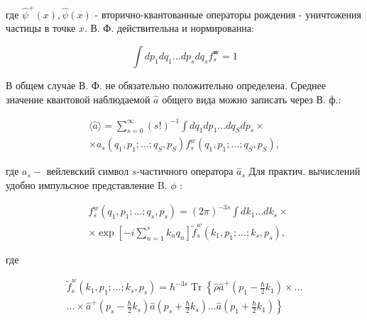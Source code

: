 \documentclass[10pt]{article}
\begin{document}
где $\hat{\psi}^{+}(x), \hat{\psi}(x)$ - вторично-квантованные операторы рождения - уничтожения частицы в точке $x$. В. Ф. действительна и нормированна:



\[

\int d p_{1} d q_{1} \ldots d p_{s} d q_{s} f_{s}^{\boldsymbol{w}}=1

\]



В общем случае В. Ф. не обязательно положительно определена. Среднее значение квантовой наблюдаемой $\hat{a}$ общего вида можно записать через В. ф.:



\[

\begin{gathered}

\langle\hat{a}\rangle=\sum_{s=0}^{\infty}(s !)^{-1} \int d q_{1} d p_{1} \ldots d q_{S} d p_{s} \times \\

\times a_{s}\left(q_{1}, p_{1} ; \ldots ; q_{S}, p_{S}\right) f_{s}^{w}\left(q_{1}, p_{1} ; \ldots ; q_{S}, p_{S}\right),

\end{gathered}

\]



где $a_{s}-$ вейлевский символ $s$-частичного оператора $\hat{a}_{s}$ Для практич. вычислений удобно импульсное представление B. $\phi$ :



\[

\begin{aligned}

& f_{s}^{w}\left(q_{1}, p_{1} ; \ldots ; q_{s}, p_{s}\right)=(2 \pi)^{-3 s} \int d k_{1} \ldots d k_{s} \times \\

& \times \exp \left[-i \sum_{n=1}^{s} k_{n} q_{n}\right] \tilde{f}_{s}^{w}\left(k_{1}, p_{1} ; \ldots ; k_{s}, p_{s}\right),

\end{aligned}

\]



где



\[

\begin{gathered}

\tilde{f}_{s}^{w}\left(k_{1}, p_{1} ; \ldots ; k_{s}, p_{s}\right)=\hbar^{-3 s} \operatorname{Tr}\left\{\hat{\rho} \hat{a}^{+}\left(p_{1}-\frac{\hbar}{2} k_{1}\right) \times \ldots\right. \\

\left.\ldots \times \hat{a}^{+}\left(p_{s}-\frac{\hbar}{2} k_{s}\right) \hat{a}\left(p_{s}+\frac{\hbar}{2} k_{s}\right) \ldots \hat{a}\left(p_{1}+\frac{\hbar}{2} k_{1}\right)\right\}

\end{gathered}

\]
\end{document}

